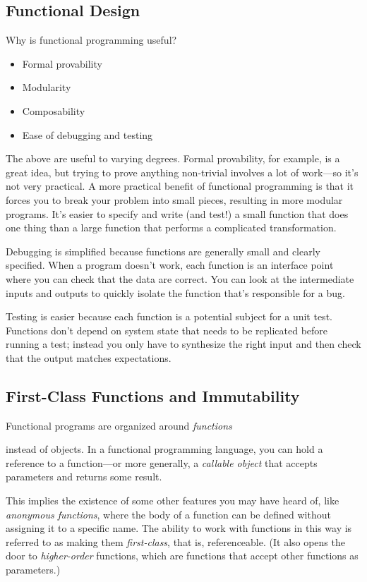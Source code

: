 \documentclass[ignorenonframetext,red]{beamer}
\begin{document}
\subsection{Functional Design}
\begin{frame}
\noindent Why is functional programming useful?
\begin{itemize}
\pause \item Formal provability
\pause \item Modularity
\pause \item Composability
\pause \item Ease of debugging and testing
\end{itemize}
\end{frame}

\noindent The above are useful to varying degrees. Formal provability, for example, is a great idea, but trying to prove anything non-trivial involves a lot of work---so it's not very practical. A more practical benefit of functional programming is that it forces you to break your problem into small pieces, resulting in more modular programs.  It’s easier to specify and write (and test!) a small function that does one thing than a large function that performs a complicated transformation.

Debugging is simplified because functions are generally small and clearly specified. When a program doesn’t work, each function is an interface point where you can check that the data are correct. You can look at the intermediate inputs and outputs to quickly isolate the function that’s responsible for a bug.

Testing is easier because each function is a potential subject for a unit test. Functions don’t depend on system state that needs to be replicated before running a test; instead you only have to synthesize the right input and then check that the output matches expectations.

\subsection{First-Class Functions and Immutability}
\begin{frame}
Functional programs are organized around \textit{functions}
\end{frame}%
instead of objects. In a functional programming language, you can hold a reference to a function---or more generally, a \textit{callable object} that accepts parameters and returns some result.

This implies the existence of some other features you may have heard of, like \textit{anonymous functions}, where the body of a function can be defined without assigning it to a specific name. The ability to work with functions in this way is referred to as making them \textit{first-class}, that is, referenceable. (It also opens the door to \textit{higher-order} functions, which are functions that accept other functions as parameters.)
\end{document}

